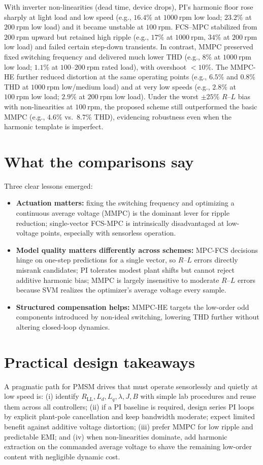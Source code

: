 With inverter non-linearities (dead time, device drops), PI’s harmonic floor rose sharply at light load and low speed (e.g., $16.4\%$ at $1000~\mathrm{rpm}$ low load; $23.2\%$ at $200~\mathrm{rpm}$ low load) and it became unstable at $100~\mathrm{rpm}$. FCS–MPC stabilized from $200~\mathrm{rpm}$ upward but retained high ripple (e.g., $17\%$ at $1000~\mathrm{rpm}$, $34\%$ at $200~\mathrm{rpm}$ low load) and failed certain step-down transients. In contrast, MMPC preserved fixed switching frequency and delivered much lower THD (e.g., $8\%$ at $1000~\mathrm{rpm}$ low load; $1.1\%$ at $100$–$200~\mathrm{rpm}$ rated load), with overshoot $<10\%$. The MMPC-HE further reduced distortion at the same operating points (e.g., $6.5\%$ and $0.8\%$ THD at $1000~\mathrm{rpm}$ low/medium load) and at very low speeds (e.g., $2.8\%$ at $100~\mathrm{rpm}$ low load; $2.9\%$ at $200~\mathrm{rpm}$ low load). Under the worst $\pm25\%$ $R$–$L$ bias with non-linearities at $100~\mathrm{rpm}$, the proposed scheme still outperformed the basic MMPC (e.g., $4.6\%$ vs.\ $8.7\%$ THD), evidencing robustness even when the harmonic template is imperfect.

\section*{What the comparisons say}
Three clear lessons emerged:
\begin{itemize}
  \item \textbf{Actuation matters:} fixing the switching frequency and optimizing a continuous average voltage (MMPC) is the dominant lever for ripple reduction; single-vector FCS-MPC is intrinsically disadvantaged at low-voltage points, especially with sensorless operation.
  \item \textbf{Model quality matters differently across schemes:} MPC-FCS decisions hinge on one-step predictions for a single vector, so $R$–$L$ errors directly misrank candidates; PI tolerates modest plant shifts but cannot reject additive harmonic bias; MMPC is largely insensitive to moderate $R$–$L$ errors because SVM realizes the optimizer’s average voltage every sample.
  \item \textbf{Structured compensation helps:} MMPC-HE targets the low-order odd components introduced by non-ideal switching, lowering THD further without altering closed-loop dynamics.
\end{itemize}

\section*{Practical design takeaways}
A pragmatic path for PMSM drives that must operate sensorlessly and quietly at low speed is: (i) identify $R_{\mathrm{LL}},L_d,L_q,\lambda,J,B$ with simple lab procedures and reuse them across all controllers; (ii) if a PI baseline is required, design series PI loops by explicit plant-pole cancellation and keep bandwidth moderate; expect limited benefit against additive voltage distortion; (iii) prefer MMPC for low ripple and predictable EMI; and (iv) when non-linearities dominate, add harmonic extraction on the commanded average voltage to shave the remaining low-order content with negligible dynamic cost.

